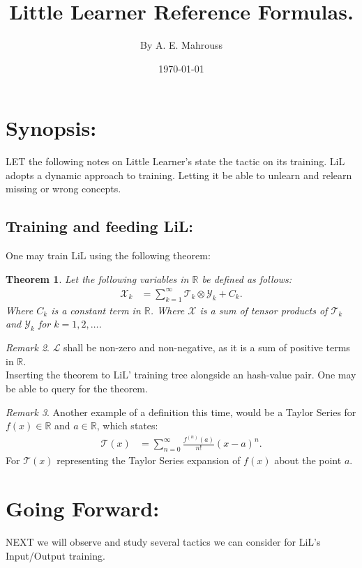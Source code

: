\documentclass[10pt]{article}
\title{%
	\vspace{-1.5em}%
	\large\textbf{Little Learner Reference Formulas.}%
}
\author{By A. E. Mahrouss}
\date{\today}
\theoremstyle{plain}
\newtheorem{theorem}{Theorem}[section]
\theoremstyle{definition}
\theoremstyle{remark}
\newtheorem{remark}[theorem]{Remark}
\begin{document}

\maketitle
\tableofcontents
\newpage

\section{Synopsis:}

\lettrine[lines=1, lhang=0.1, loversize=0.2]{L}ET the following notes on Little Learner's state the tactic on its training. LiL adopts a dynamic approach to training. Letting it be able to unlearn and relearn missing or wrong concepts.

\subsection{Training and feeding LiL:}

One may train LiL using the following theorem:

\begin{theorem}
Let the following variables in $\mathbb{R}$ be defined as follows:
\begin{align*}
    \mathcal{X}_k &= \sum_{k=1}^{\infty} \mathcal{T}_k \otimes \mathcal{Y}_k + C_k.
\end{align*}
Where $C_k$ is a constant term in $\mathbb{R}$. Where $\mathcal{X}$ is a sum of tensor products of $\mathcal{T}_k$ and $\mathcal{Y}_k$ for $k=1,2,\ldots$.
\end{theorem}

\begin{remark}
    $\mathcal{L}$ shall be non-zero and non-negative, as it is a sum of positive terms in $\mathbb{R}$.\\
	Inserting the theorem to LiL' training tree alongside an hash-value pair. One may be able to query for the theorem.
\end{remark}

\begin{remark}
	Another example of a definition this time, would be a Taylor Series for $f(x) \in \mathbb{R}$ and $a \in \mathbb{R}$, which states:
	\begin{align*}
		\mathcal{T}(x) &= \sum_{n=0}^{\infty} \frac{f^{(n)}(a)}{n!} (x-a)^n.
	\end{align*}
	For $\mathcal{T}(x)$ representing the Taylor Series expansion of $f(x)$ about the point $a$.
\end{remark}

\section{Going Forward:}

\lettrine[lines=1, lhang=0.1, loversize=0.2]{N}EXT we will observe and study several tactics we can consider for LiL's Input/Output training.

\nocite{*}



\end{document}
